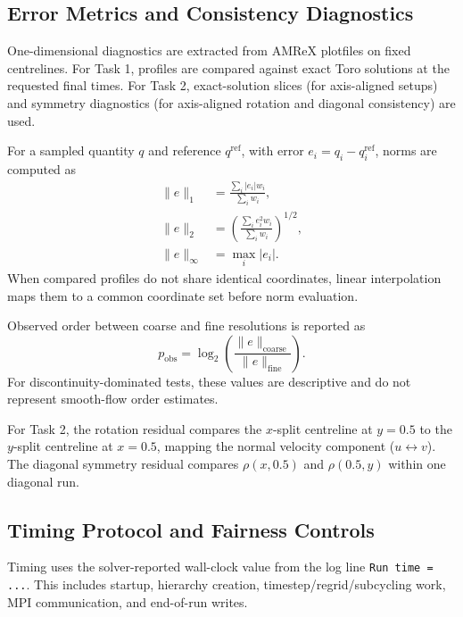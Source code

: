\documentclass[final,3p,times,twocolumn]{elsarticle}
\begin{document}
\subsection{Error Metrics and Consistency Diagnostics}

One-dimensional diagnostics are extracted from AMReX plotfiles on fixed centrelines. For Task 1, profiles are compared against exact Toro solutions at the requested final times. For Task 2, exact-solution slices (for axis-aligned setups) and symmetry diagnostics (for axis-aligned rotation and diagonal consistency) are used.

For a sampled quantity $q$ and reference $q^\mathrm{ref}$, with error $e_i=q_i-q_i^\mathrm{ref}$, norms are computed as
\begin{equation}
\begin{aligned}
\|e\|_1 &= \frac{\sum_i |e_i|w_i}{\sum_i w_i},\\
\|e\|_2 &= \left(\frac{\sum_i e_i^2w_i}{\sum_i w_i}\right)^{1/2},\\
\|e\|_\infty &= \max_i |e_i|.
\end{aligned}
\end{equation}
When compared profiles do not share identical coordinates, linear interpolation maps them to a common coordinate set before norm evaluation.

Observed order between coarse and fine resolutions is reported as
\begin{equation}
p_{\mathrm{obs}}=\log_2\left(\frac{\|e\|_{\mathrm{coarse}}}{\|e\|_{\mathrm{fine}}}\right).
\end{equation}
For discontinuity-dominated tests, these values are descriptive and do not represent smooth-flow order estimates.

For Task 2, the rotation residual compares the $x$-split centreline at $y=0.5$ to the $y$-split centreline at $x=0.5$, mapping the normal velocity component ($u\leftrightarrow v$). The diagonal symmetry residual compares $\rho(x,0.5)$ and $\rho(0.5,y)$ within one diagonal run.

\subsection{Timing Protocol and Fairness Controls}

Timing uses the solver-reported wall-clock value from the log line \texttt{Run time = ...}. This includes startup, hierarchy creation, timestep/regrid/subcycling work, MPI communication, and end-of-run writes.
\end{document}
